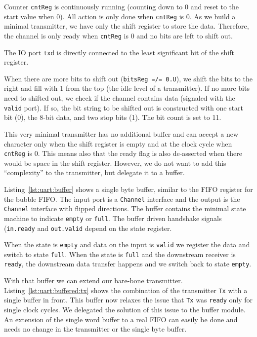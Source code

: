 \documentclass[%
    10pt,
    headinclude, footexclude,
    openright, %
    notitlepage,
    cleardoubleempty,
    headsepline,
    pointlessnumbers,
    bibtotoc, idxtotoc,
    ]{scrbook}
\newcommand{\code}[1]{{\small{\texttt{#1}}}}
\begin{document}
Counter \code{cntReg} is continuously running (counting down to 0
and reset to the start value when 0). All action is only done when
\code{cntReg} is 0. As we build a minimal transmitter, we have only
the shift register to store the data. Therefore, the channel is only ready
when \code{cntReg} is 0 and no bits are left to shift out.

The IO port \code{txd} is directly connected to the least significant bit
of the shift register.

When there are more bits to shift out (\code{bitsReg =/= 0.U}),
we shift the bits to the right and fill with 1 from the top (the idle level
of a transmitter).
If no more bits need to shifted out, we check if the channel contains
data (signaled with the \code{valid} port). If so, the bit string to
be shifted out is constructed with one start bit (0), the 8-bit data, and
two stop bits (1). The bit count is set to 11.

This very minimal transmitter has no additional buffer and can
accept a new character only when the shift register is empty
and at the clock cycle when \code{cntReg} is 0. This means also
that the ready flag is also de-asserted when there would be
space in the shift register. However, we do not want to add this
``complexity'' to the transmitter, but delegate it to a buffer.

Listing~\ref{lst:uart:buffer} shows a single byte buffer, similar to
the FIFO register for the bubble FIFO. The input port is a \code{Channel}
interface and the output is the \code{Channel} interface with
flipped directions. The buffer contains the minimal state machine
to indicate \code{empty} or \code{full}. The buffer driven handshake
signals (\code{in.ready} and \code{out.valid} depend on the state
register.

When the state is \code{empty} and data on the input is \code{valid}
we register the data and switch to state \code{full}.
When the state is \code{full} and the downstream receiver is
\code{ready}, the downstream data transfer happens and we switch
back to state \code{empty}.

With that buffer we can extend our bare-bone transmitter.
Listing~\ref{lst:uart:buffered:tx} shows the combination of the transmitter \code{Tx}
with a single buffer in front. This buffer now relaxes the issue that \code{Tx}
was \code{ready} only for single clock cycles. We delegated the solution of
this issue to the buffer module.
An extension of the single word buffer to a real FIFO can easily be done
and needs no change in the transmitter or the single byte buffer.
\end{document}
